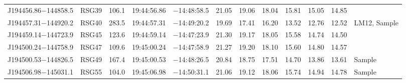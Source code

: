 \documentclass[iop]{emulateapj}
\begin{document}
\begin{table*}
\begin{center}
\begin{tabular}{llrccccccccl}
J194456.86$-$144858.5  &  RSG39  & 106.1 &   19:44:56.86  &  $-$14:48:58.5  &  21.05  &  19.06  &  18.04  &  15.81  &  15.05  &  14.85 \\
J194457.31$-$144920.2  &  RSG40  & 283.5 &   19:44:57.31  &  $-$14:49:20.2  &  19.69  &  17.41  &  16.20  &  13.52  &  12.76  &  12.52 & LM12, Sample \\
J194459.14$-$144723.9  &  RSG45  & 123.6 &   19:44:59.14  &  $-$14:47:23.9  &  21.30  &  19.17  &  18.05  &  15.58  &  14.74  &  14.50 \\
J194500.24$-$144758.9  &  RSG47  & 109.6 &   19:45:00.24  &  $-$14:47:58.9  &  21.27  &  19.20  &  18.10  &  15.60  &  14.80  &  14.57 \\
J194500.53$-$144826.5  &  RSG49  & 167.4 &   19:45:00.53  &  $-$14:48:26.5  &  20.84  &  18.75  &  17.51  &  14.70  &  13.86  &  13.61 & Sample\\
J194506.98$-$145031.1  &  RSG55  & 104.0 &   19:45:06.98  &  $-$14:50:31.1  &  21.06  &  19.12  &  18.06  &  15.74  &  14.94  &  14.78 & Sample\\

\hline
\end{tabular}
\end{center}
\end{table*}
\end{document}

